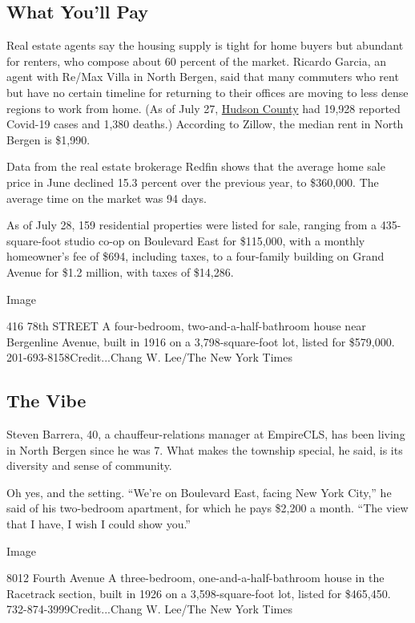 \hypertarget{what-youll-pay}{%
\subsection{What You'll Pay}\label{what-youll-pay}}

Real estate agents say the housing supply is tight for home buyers but
abundant for renters, who compose about 60 percent of the market.
Ricardo Garcia, an agent with Re/Max Villa in North Bergen, said that
many commuters who rent but have no certain timeline for returning to
their offices are moving to less dense regions to work from home. (As of
July 27,
\href{https://hudson-county-coronavirus-resources-hudsoncogis.hub.arcgis.com/}{Hudson
County} had 19,928 reported Covid-19 cases and 1,380 deaths.) According
to Zillow, the median rent in North Bergen is \$1,990.

Data from the real estate brokerage Redfin shows that the average home
sale price in June declined 15.3 percent over the previous year, to
\$360,000. The average time on the market was 94 days.

As of July 28, 159 residential properties were listed for sale, ranging
from a 435-square-foot studio co-op on Boulevard East for \$115,000,
with a monthly homeowner's fee of \$694, including taxes, to a
four-family building on Grand Avenue for \$1.2 million, with taxes of
\$14,286.

Image

416 78th STREET \textbar{} A four-bedroom, two-and-a-half-bathroom house
near Bergenline Avenue, built in 1916 on a 3,798-square-foot lot, listed
for \$579,000. 201-693-8158Credit...Chang W. Lee/The New York Times

\hypertarget{the-vibe}{%
\subsection{The Vibe}\label{the-vibe}}

Steven Barrera, 40, a chauffeur-relations manager at EmpireCLS, has been
living in North Bergen since he was 7. What makes the township special,
he said, is its diversity and sense of community.

Oh yes, and the setting. ``We're on Boulevard East, facing New York
City,'' he said of his two-bedroom apartment, for which he pays \$2,200
a month. ``The view that I have, I wish I could show you.''

Image

8012 Fourth Avenue \textbar{} A three-bedroom, one-and-a-half-bathroom
house in the Racetrack section, built in 1926 on a 3,598-square-foot
lot, listed for \$465,450. 732-874-3999Credit...Chang W. Lee/The New
York Times


